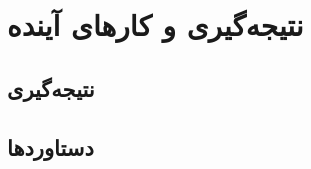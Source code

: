 
\chapter{نتیجه‌گیری و کارهای آینده} \label{ch:concl}
\thispagestyle{empty}


\section{نتیجه‌گیری}
\paragraph{}
{



}

\section{دستاوردها}

